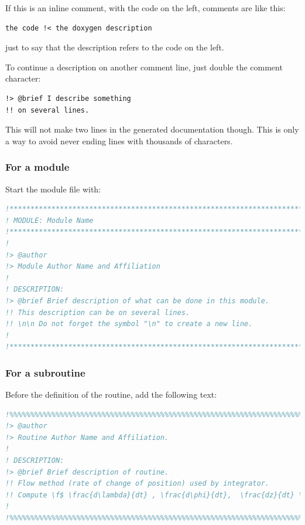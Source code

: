 \documentclass[english,a4paper,twoside]{article}
\begin{document}
If this is an inline comment, with the code on the left, comments are like this:
\begin{verbatim}
the code !< the doxygen description
\end{verbatim}
just to say that the description refers to the code on the left.

To continue a description on another comment line, just double the comment character:
\begin{verbatim}
!> @brief I describe something
!! on several lines.
\end{verbatim}

\begin{remarque}
This will not make two lines in the generated documentation though. This is only a way to avoid never ending lines with thousands of characters.
\end{remarque}


\subsubsection{For a module}
Start the module file with:
\begin{lstlisting}[language=Fortran]
!******************************************************************************
! MODULE: Module Name
!******************************************************************************
!
!> @author
!> Module Author Name and Affiliation
!
! DESCRIPTION: 
!> @brief Brief description of what can be done in this module. 
!! This description can be on several lines. 
!! \n\n Do not forget the symbol "\n" to create a new line.
!
!******************************************************************************
\end{lstlisting}

\subsubsection{For a subroutine}
Before the definition of the routine, add the following text:
\begin{lstlisting}[language=Fortran]
!%%%%%%%%%%%%%%%%%%%%%%%%%%%%%%%%%%%%%%%%%%%%%%%%%%%%%%%%%%%%%%%%%%%%%%%%%%%
!> @author 
!> Routine Author Name and Affiliation.
!
! DESCRIPTION: 
!> @brief Brief description of routine. 
!! Flow method (rate of change of position) used by integrator.
!! Compute \f$ \frac{d\lambda}{dt} , \frac{d\phi}{dt},  \frac{dz}{dt} \f$ }
!
!%%%%%%%%%%%%%%%%%%%%%%%%%%%%%%%%%%%%%%%%%%%%%%%%%%%%%%%%%%%%%%%%%%%%%%%%%%% 
\end{lstlisting}
\end{document}
